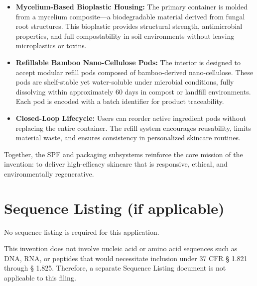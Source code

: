 \documentclass{article}
\theoremstyle{plain}
\theoremstyle{claimstyle}
\begin{document}
\begin{itemize}
    \item \textbf{Mycelium-Based Bioplastic Housing:}  
    The primary container is molded from a mycelium composite—a biodegradable material derived from fungal root structures. This bioplastic provides structural strength, antimicrobial properties, and full compostability in soil environments without leaving microplastics or toxins.

    \item \textbf{Refillable Bamboo Nano-Cellulose Pods:}  
    The interior is designed to accept modular refill pods composed of bamboo-derived nano-cellulose. These pods are shelf-stable yet water-soluble under microbial conditions, fully dissolving within approximately 60 days in compost or landfill environments. Each pod is encoded with a batch identifier for product traceability.

    \item \textbf{Closed-Loop Lifecycle:}  
    Users can reorder active ingredient pods without replacing the entire container. The refill system encourages reusability, limits material waste, and ensures consistency in personalized skincare routines.
\end{itemize}

Together, the SPF and packaging subsystems reinforce the core mission of the invention: to deliver high-efficacy skincare that is responsive, ethical, and environmentally regenerative.
\section*{Sequence Listing (if applicable)}

No sequence listing is required for this application.

This invention does not involve nucleic acid or amino acid sequences such as DNA, RNA, or peptides that would necessitate inclusion under 37 CFR § 1.821 through § 1.825. Therefore, a separate Sequence Listing document is not applicable to this filing.


\nocite{*}


\end{document}
